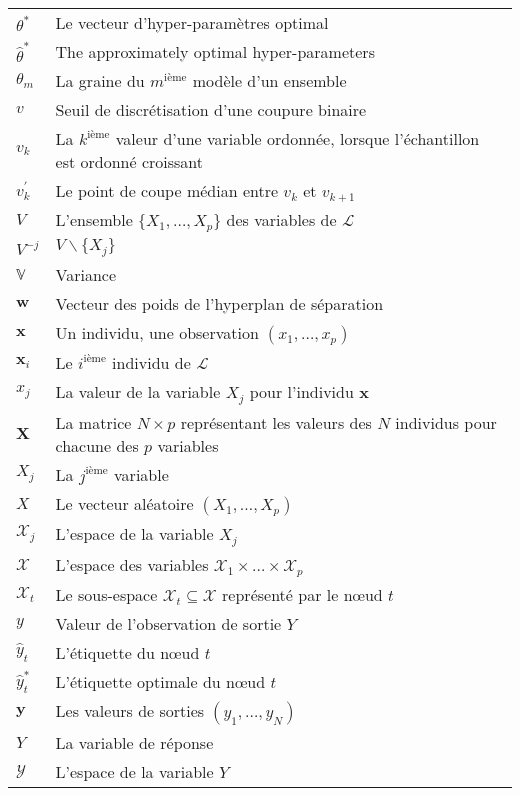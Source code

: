 \begin{tabularx}{\textwidth}{ l X }
$\theta^*$ & Le vecteur d'hyper-paramètres optimal   \\
$\widehat{\theta}^*$ & The approximately optimal hyper-parameters   \\
$\theta_m$ & La graine du $m^\text{ième}$ modèle d'un ensemble   \\
$v$ & Seuil de discrétisation d'une coupure binaire   \\
$v_k$ & La $k^\text{ième}$ valeur d'une variable ordonnée, lorsque l'échantillon est ordonné croissant   \\
$v_k^\prime$ & Le point de coupe médian entre $v_k$ et $v_{k+1}$   \\
$V$ & L'ensemble $\{X_1, \dots, X_p\}$ des variables de $\mathcal{L}$   \\
$V^{-j}$ & $V \smallsetminus \{X_j\}$   \\
$\mathbb{V}$ & Variance  \\
$\mathbf{w}$ & Vecteur des poids de l'hyperplan de séparation  \\
$\mathbf{x}$ & Un individu, une observation $(x_1, \dots, x_p)$   \\
$\mathbf{x}_i$ & Le $i^\text{ième}$ individu de $\mathcal{L}$   \\
$x_j$ & La valeur de la variable $X_j$ pour l'individu $\mathbf{x}$   \\
$\mathbf{X}$ & La matrice $N\times p$ représentant les valeurs des $N$ individus pour chacune des $p$ variables   \\
$X_j$ & La $j^\text{ième}$ variable   \\
$X$ & Le vecteur aléatoire $(X_1,\dots,X_p)$   \\
$\mathcal{X}_j$ & L'espace de la variable $X_j$   \\
$\mathcal{X}$ & L'espace des variables $\mathcal{X}_1 \times \dots \times \mathcal{X}_p$   \\
$\mathcal{X}_t$ & Le sous-espace $\mathcal{X}_t \subseteq \mathcal{X}$ représenté par le nœud $t$   \\
$y$ & Valeur de l'observation de sortie $Y$   \\
$\widehat{y}_t$ & L'étiquette du nœud $t$   \\
$\widehat{y}_t^*$ & L'étiquette optimale du nœud $t$   \\
$\mathbf{y}$ & Les valeurs de sorties $(y_1,\dots,y_N)$   \\
$Y$ & La variable de réponse   \\
$\mathcal{Y}$ & L'espace de la variable $Y$   \\
\end{tabularx}
